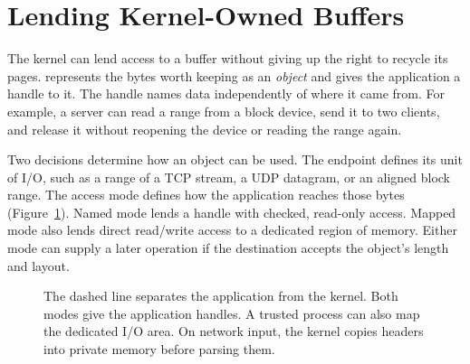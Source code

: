 \section{Lending Kernel-Owned Buffers}
\label{sec:lending}

The kernel can lend access to a buffer without giving up the right to recycle
its pages. \sys represents the bytes worth keeping as an \emph{object} and
gives the application a handle to it. The handle names data independently of
where it came from. For example, a server can read a range from a block device,
send it to two clients, and release it without reopening the device or reading
the range again.

Two decisions determine how an object can be used. The endpoint defines its unit
of I/O, such as a range of a TCP stream, a UDP datagram, or an aligned block
range. The access mode defines how the application reaches those bytes
(Figure~\ref{fig:modes}). Named mode lends a handle with checked, read-only
access. Mapped mode also lends direct read/write access to a dedicated region
of memory. Either mode can supply a later operation if the destination accepts
the object's length and layout.

\begin{figure}[t]
\centering
{}
\caption{The dashed line separates the application from the kernel. Both modes give
the application handles. A trusted process can also map the dedicated I/O area.
On network input, the kernel copies headers into private memory before parsing them.}
\label{fig:modes}
\end{figure}

